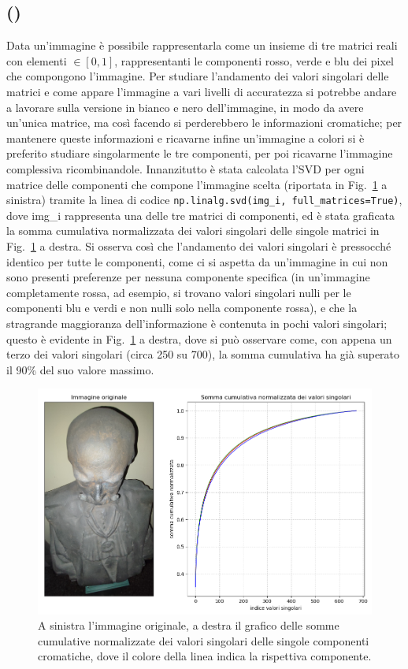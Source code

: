 \documentclass[a4paper]{article}
\newcounter{count_es}
\newcounter{count_sub_es}[count_es]
\renewcommand{\figurename}{Fig.}
\begin{document}
\subsection*{ ()}
Data un'immagine è possibile rappresentarla come un insieme di tre matrici reali
con elementi \(\in [0,1]\), rappresentanti le componenti rosso, verde e blu dei pixel che
compongono l'immagine. Per studiare l'andamento dei valori singolari delle matrici e come appare
l'immagine a vari livelli di accuratezza si potrebbe andare a lavorare sulla versione in bianco e nero dell'immagine,
in modo da avere un'unica matrice, ma così facendo si perderebbero le informazioni cromatiche; per mantenere queste informazioni e ricavarne
infine un'immagine a colori si è preferito studiare singolarmente le tre componenti, per poi ricavarne l'immagine complessiva ricombinandole.
Innanzitutto è stata calcolata l'SVD per ogni matrice delle componenti che compone l'immagine scelta (riportata in \figurename~\ref{fig:es_2b_1} a sinistra) tramite
la linea di codice \lstinline{np.linalg.svd(img_i, full_matrices=True)},
dove img\_i rappresenta una delle tre matrici di componenti, ed è stata graficata la somma cumulativa normalizzata dei valori singolari delle singole matrici in \figurename~\ref{fig:es_2b_1} a destra. 
Si osserva così che l'andamento dei valori singolari è pressocché identico per tutte le componenti, come ci si aspetta
da un'immagine in cui non sono presenti preferenze per nessuna componente specifica (in un'immagine completamente rossa, ad esempio, si trovano 
valori singolari nulli per le componenti blu e verdi e non nulli solo nella componente rossa), e che la stragrande maggioranza dell'informazione è
contenuta in pochi valori singolari; questo è evidente in \figurename~\ref{fig:es_2b_1} a destra, dove si può osservare come, con appena un terzo dei
valori singolari (circa 250 su 700), la somma cumulativa ha già superato il 90\% del suo valore massimo.
\begin{figure}[H]
    \centering
    \includegraphics[width=.75\linewidth]{Es_2b_1.png}
    \caption{A sinistra l'immagine originale, a destra il grafico delle somme cumulative normalizzate
    dei valori singolari delle singole componenti cromatiche, dove il colore della linea indica la rispettiva componente.\label{fig:es_2b_1}}
\end{figure}
\end{document}
